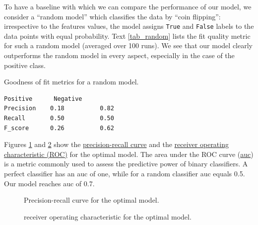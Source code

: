 \documentclass[10pt,parskip=half,
toc=sectionentrywithdots,
bibliography=totocnumbered,
captions=tableheading,numbers=noendperiod]{scrartcl}
\begin{document}
To have a baseline with which we can compare the performance of our
model, we consider a ``random model'' which classifies the data by
``coin flipping'': irrespective to the features values, the model
assigns \texttt{True} and \texttt{False} labels to the data points with
equal probability. Text \ref{tab_random} lists the fit quality metric
for such a random model (averaged over 100 runs). We see that our model
clearly outperforms the random model in every aspect, especially in the
case of the positive class.

\begin{textcell}[H]
\caption{Goodness of fit metrics for a random model.}
\label{tab_random}
\begin{lstlisting}[aboveskip=5pt,basicstyle=\small,belowskip=5pt,breakindent=0pt,language={},numbers=none,postbreak={},xrightmargin=7pt]
           Positive      Negative
Precision    0.18          0.82
Recall       0.50          0.50
F_score      0.26          0.62

\end{lstlisting}\end{textcell}

Figures \ref{fig_pr} and \ref{fig_roc} show the
\href{https://acutecaretesting.org/en/articles/precision-recall-curves-what-are-they-and-how-are-they-used}{precision-recall
curve} and the
\href{https://en.wikipedia.org/wiki/Receiver_operating_characteristic}{receiver
operating characteristic (ROC)} for the optimal model. The area under
the ROC curve
(\href{https://towardsdatascience.com/understanding-auc-roc-curve-68b2303cc9c5}{auc})
is a metric commonly used to assess the predictive power of binary
classifiers. A perfect classifier has an auc of one, while for a random
classifier auc equals 0.5. Our model reaches auc of 0.7.

\begin{figure}[H]\begin{center}\end{center}\caption{Precision-recall curve for the optimal model.}\label{fig_pr}\end{figure}

\begin{figure}[H]\begin{center}\end{center}\caption{receiver operating characteristic for the optimal model.}\label{fig_roc}\end{figure}
\end{document}

